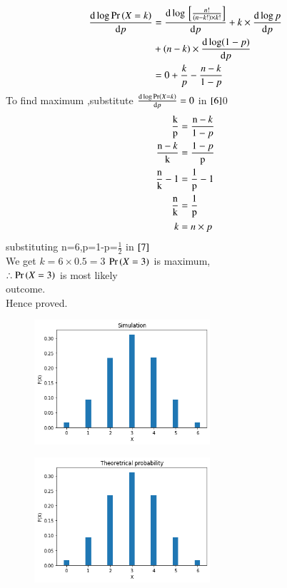 \documentclass[journal,12pt,twocolumn]{IEEEtran}
\begin{document}
\begin{align}
\frac{\mathrm{d} \log \Pr\left(X=k\right) }{\mathrm{d} p}&=\frac{\mathrm{d} \log {}\left[\frac{n!}{(n-k!)\times k!}\right]}{\mathrm{d}p}+k\times  \frac{\mathrm{d}\log p}{\mathrm{d} p} \\
     &+(n-k) \times \frac{\mathrm{d}\log (1-p)}{\mathrm{d} p} \notag \\
     &=0+\frac{k}{p}-\frac{n-k}{1-p} \label{6}
\end{align}
To find maximum ,substitute $\frac{\mathrm{d} \log  \Pr\left(X=k\right) }{\mathrm{d} p}=0$ in $\eqref{6}$0
\begin{align}
\frac{\mbox k}{\mbox p}&=\frac{\mbox n-k}{\mbox 1-p}  \\
\frac{\mbox n-k}{\mbox k}&=\frac{\mbox 1-p}{\mbox p}  \\
\frac{\mbox n}{\mbox k}-1&=\frac{\mbox 1}{\mbox p}-1  \\
\frac{\mbox n}{\mbox k}&=\frac{\mbox 1}{\mbox p}  \\
k&=n\times p \label{7}
\end{align}
substituting n=6,p=1-p=$\frac{1}{2}$ in $\eqref{7}$\\
We get $k=6\times 0.5=3$
$\Pr\left(X=3\right)$ is maximum,\\
$\therefore\Pr\left(X=3\right)$ is most likely \\
outcome.\\
Hence proved.

\begin{figure}
\begin{center}
\includegraphics[width=0.58\textwidth]{assignment1.png}
\end{center}
\end{figure}
\begin{figure}
\begin{center}
\includegraphics[width=0.58\textwidth]{assignment-1.png}
\end{center}
\end{figure}
\end{document}
